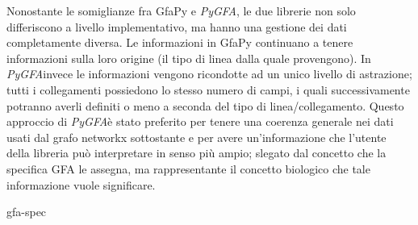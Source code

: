 \documentclass[11pt, a4paper]{book}
\newcommand {\pygfa} {\textit{PyGFA}}
\begin{document}
Nonostante le somiglianze fra GfaPy e \pygfa, le due librerie non solo differiscono
a livello implementativo, ma hanno una gestione dei dati completamente diversa.
Le informazioni in GfaPy continuano a tenere informazioni sulla loro origine (il tipo
di linea dalla quale provengono). In \pygfa invece le informazioni vengono	
ricondotte ad un unico livello di astrazione; tutti i collegamenti possiedono
lo stesso numero di campi, i quali successivamente potranno averli definiti o meno
a seconda del tipo di linea/collegamento. Questo approccio di \pygfa è stato
preferito per tenere una coerenza generale nei dati usati dal grafo networkx
sottostante e per avere un'informazione che l'utente della libreria può interpretare
in senso più ampio; slegato dal concetto che la specifica GFA le assegna, ma
rappresentante il concetto biologico che tale informazione vuole significare.



 {gfa-spec}







\printbibliography

\end{document}
